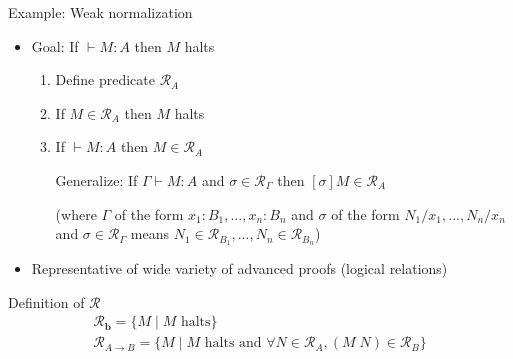 \documentclass[usenames,dvipsnames]{beamer}
\newcommand{\const}[1]{\textbf{#1}}
\newcommand{\arrow}{\to}
\newcommand{\stepsto}{\longrightarrow}
\begin{document}
\begin{frame}[fragile]{Example: Weak normalization}
\begin{itemize}
\item Goal: If $\vdash M : A$ then $M$ halts
\begin{enumerate}
\item Define predicate $\mathcal{R}_A$
\item If $M \in \mathcal{R}_A$ then $M$ halts
\item If $\vdash M : A$ then $M \in \mathcal{R}_A$
\pause

Generalize: {\color{purple}If $\Gamma \vdash M : A$ and $\sigma \in \mathcal{R}_\Gamma$ then $[\sigma]M \in \mathcal{R}_A$}

(where $\Gamma$ of the form $x_1{:}B_1,...,x_n{:}B_n$ and $\sigma$ of the form $N_1/x_1,...,N_n/x_n$ and $\sigma \in \mathcal{R}_\Gamma$ means $N_1 \in \mathcal{R}_{B_1},...,N_n \in \mathcal{R}_{B_n}$)
\end{enumerate}
\pause \item Representative of wide variety of advanced proofs (logical relations)
\end{itemize}

\end{frame}

\begin{frame}{Definition of $\mathcal{R}$}
\[
\begin{array}{l}
\mathcal{R}_{\const b} = \{M\; |\; M \text{ halts}\} \\
\mathcal{R}_{A \arrow B} = \{M\; |\; M \text{ halts and } \forall N
\in \mathcal{R}_A, (M\; N) \in \mathcal{R}_B \}
\end{array}
\]
\end{frame}
\end{document}
